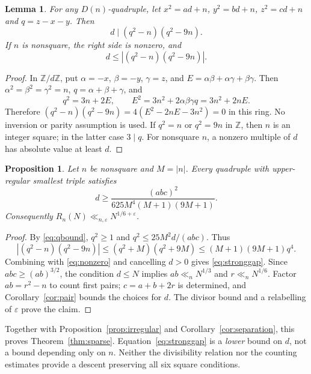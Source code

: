 \documentclass[11pt,a4paper]{article}
\numberwithin{equation}{section}
\newtheorem{lemma}[theorem]{Lemma}
\newtheorem{proposition}[theorem]{Proposition}
\theoremstyle{remark}
\newcommand{\Z}{\mathbb Z}
\newcommand{\eps}{\varepsilon}
\begin{document}
\begin{lemma}\label{lem:divisibility}
For any $D(n)$-quadruple, let $x^2=ad+n$, $y^2=bd+n$, $z^2=cd+n$ and $q=z-x-y$. Then
\begin{equation}\label{eq:divisibility}
d\mid(q^2-n)(q^2-9n).
\end{equation}
If $n$ is nonsquare, the right side is nonzero, and
\begin{equation}\label{eq:nonzero}
d\le\left|(q^2-n)(q^2-9n)\right|.
\end{equation}
\end{lemma}
\begin{proof}
In $\Z/d\Z$, put $\alpha=-x$, $\beta=-y$, $\gamma=z$, and $E=\alpha\beta+\alpha\gamma+\beta\gamma$. Then $\alpha^2=\beta^2=\gamma^2=n$, $q=\alpha+\beta+\gamma$, and
\[
q^2=3n+2E,\qquad E^2=3n^2+2\alpha\beta\gamma q=3n^2+2nE.
\]
Therefore $(q^2-n)(q^2-9n)=4(E^2-2nE-3n^2)=0$ in this ring. No inversion or parity assumption is used. If $q^2=n$ or $q^2=9n$ in $\Z$, then $n$ is an integer square; in the latter case $3\mid q$. For nonsquare $n$, a nonzero multiple of $d$ has absolute value at least $d$.
\end{proof}

\begin{proposition}\label{prop:stronggap}
Let $n$ be nonsquare and $M=|n|$. Every quadruple with upper-regular smallest triple satisfies
\begin{equation}\label{eq:stronggap}
d\ge\frac{(abc)^2}{625M^4(M+1)(9M+1)}.
\end{equation}
Consequently $R_n(N)\ll_{n,\eps}N^{1/6+\eps}$.
\end{proposition}
\begin{proof}
By \eqref{eq:qbound}, $q^2\ge1$ and $q^2\le25M^2d/(abc)$. Thus
\[
\left|(q^2-n)(q^2-9n)\right|
\le(q^2+M)(q^2+9M)\le(M+1)(9M+1)q^4.
\]
Combining with \eqref{eq:nonzero} and cancelling $d>0$ gives \eqref{eq:stronggap}. Since $abc\ge(ab)^{3/2}$, the condition $d\le N$ implies $ab\ll_n N^{1/3}$ and $r\ll_n N^{1/6}$. Factor $ab=r^2-n$ to count first pairs; $c=a+b+2r$ is determined, and Corollary~\ref{cor:pair} bounds the choices for $d$. The divisor bound and a relabelling of $\eps$ prove the claim.
\end{proof}
Together with Proposition~\ref{prop:irregular} and Corollary~\ref{cor:separation}, this proves Theorem~\ref{thm:sparse}. Equation~\eqref{eq:stronggap} is a \emph{lower} bound on $d$, not a bound depending only on $n$. Neither the divisibility relation nor the counting estimates provide a descent preserving all six square conditions.
\end{document}
